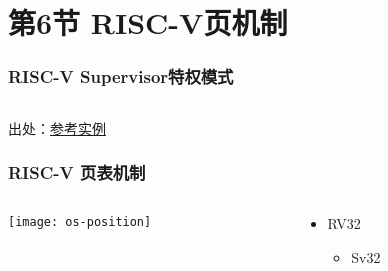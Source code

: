 \section{第6节 RISC-V页机制}%
\begin{frame}   
    \frametitle{RISC-V Supervisor特权模式}

\begin{block}{}
\begin{verbatim}

\end{verbatim}
\end{block}

出处：\href{https://rcore-os.github.io/rCore_tutorial_doc/chapter5/introduction.html}{参考实例}

\end{frame}



\begin{frame} 
\frametitle{RISC-V 页表机制}

\begin{columns}
	
	\begin{column}{.5\textwidth}
		
		\texttt{[image: os-position]}
		
	\end{column}
	
	
	\begin{column}{.5\textwidth}
		
		\begin{itemize}\Large
			\item RV32
			\begin{itemize}\large
				\item Sv32
				
			\end{itemize}
		\end{itemize}
		
	\end{column}
	
	
\end{columns}
\end{frame}




